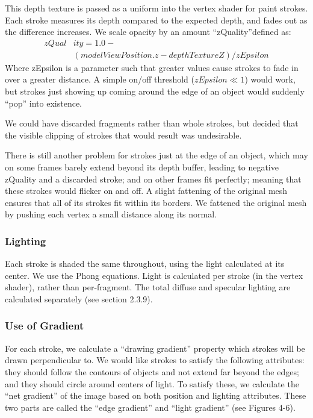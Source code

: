\documentclass[conference]{acmsiggraph}
\begin{document}
This depth texture is passed as a uniform into the vertex shader for paint
strokes. Each stroke measures its depth compared to the expected depth, and
fades out as the difference increases. We scale opacity by an amount
``zQuality''defined as:
\begin{align*}
zQual&ity = 1.0 - \\
           &(modelViewPosition.z - depthTextureZ) / zEpsilon
\end{align*}
Where zEpsilon is a parameter such that greater values cause strokes to fade in
over a greater distance. A simple on/off threshold ($zEpsilon \ll 1$) would
work, but strokes just showing up coming around the edge of an object would
suddenly ``pop'' into existence.

We could have discarded fragments rather than whole strokes, but decided that
the visible clipping of strokes that would result was undesirable.

There is still another problem for strokes just at the edge of an object, which
may on some frames barely extend beyond its depth buffer, leading to negative
zQuality and a discarded stroke; and on other frames fit perfectly; meaning
that these strokes would flicker on and off. A slight fattening of the original
mesh ensures that all of its strokes fit within its borders. We fattened the
original mesh by pushing each vertex a small distance along its normal.

\subsubsection{Lighting}

Each stroke is shaded the same throughout, using the light calculated at its
center. We use the Phong equations. Light is calculated per stroke (in the
vertex shader), rather than per-fragment. The total diffuse and specular
lighting are calculated separately (see section 2.3.9).


\subsubsection{Use of Gradient}

For each stroke, we calculate a ``drawing gradient'' property which strokes
will be drawn perpendicular to. We would like strokes to satisfy the following
attributes: they should follow the contours of objects and not extend far
beyond the edges; and they should circle around centers of light. To satisfy
these, we calculate the ``net gradient'' of the image based on both position
and lighting attributes. These two parts are called the ``edge gradient'' and
``light gradient'' (see Figures 4-6).
\end{document}
